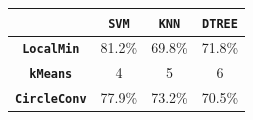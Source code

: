 \begin{tabular}{|c|c|c|c| }
\hline
 & \textbf{\texttt{SVM}} & \textbf{\texttt{KNN}} & \textbf{\texttt{DTREE}} \\ \hline
\textbf{\texttt{LocalMin}} & 81.2\% & 69.8\% & 71.8\% \\ \hline
\textbf{\texttt{kMeans}} &  4 & 5 & 6 \\ \hline
\textbf{ \texttt{CircleConv}} & 77.9\% & 73.2\% & 70.5\% \\ \hline
\end{tabular}

